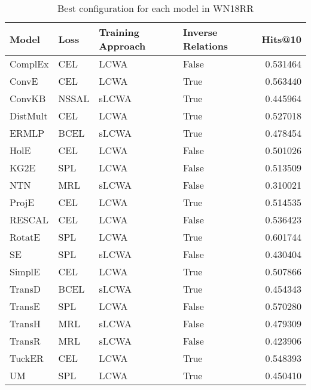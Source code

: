 \begin{table}
\centering
\caption{Best configuration for each model in WN18RR}
\label{best_models_wn18rr}
\begin{tabular}{llllr}
\toprule
    Model &   Loss & Training Approach & Inverse Relations &   Hits@10 \\
\midrule
  ComplEx &    CEL &              LCWA &             False &  0.531464 \\
    ConvE &    CEL &              LCWA &              True &  0.563440 \\
   ConvKB &  NSSAL &             sLCWA &              True &  0.445964 \\
 DistMult &    CEL &              LCWA &              True &  0.527018 \\
    ERMLP &   BCEL &             sLCWA &              True &  0.478454 \\
     HolE &    CEL &              LCWA &             False &  0.501026 \\
     KG2E &    SPL &              LCWA &             False &  0.513509 \\
      NTN &    MRL &             sLCWA &             False &  0.310021 \\
    ProjE &    CEL &              LCWA &              True &  0.514535 \\
   RESCAL &    CEL &              LCWA &             False &  0.536423 \\
   RotatE &    SPL &              LCWA &              True &  0.601744 \\
       SE &    SPL &             sLCWA &             False &  0.430404 \\
   SimplE &    CEL &              LCWA &              True &  0.507866 \\
   TransD &   BCEL &             sLCWA &              True &  0.454343 \\
   TransE &    SPL &              LCWA &             False &  0.570280 \\
   TransH &    MRL &             sLCWA &             False &  0.479309 \\
   TransR &    MRL &             sLCWA &             False &  0.423906 \\
   TuckER &    CEL &              LCWA &              True &  0.548393 \\
       UM &    SPL &              LCWA &              True &  0.450410 \\
\bottomrule
\end{tabular}
\end{table}

